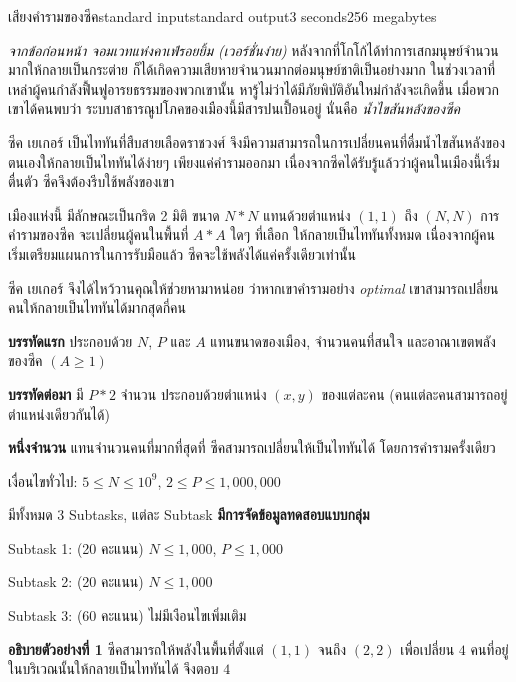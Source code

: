 \documentclass[11pt,a4paper]{article}
\begin{document}
\begin{problem}{เสียงคำรามของซีค}{standard input}{standard output}{3 seconds}{256 megabytes}

\textit{จากข้อก่อนหน้า จอมเวทแห่งคาเฟ่รอยยิ้ม (เวอร์ชั่นง่าย)} หลังจากที่โกโก้ได้ทำการเสกมนุษย์จำนวนมากให้กลายเป็นกระต่าย
ก็ได้เกิดความเสียหายจำนวนมากต่อมนุษย์ชาติเป็นอย่างมาก ในช่วงเวลาที่เหล่าผู้คนกำลังฟื้นฟูอารยธรรมของพวกเขานั้น
หารู้ไม่ว่าได้มีภัยพิบัติอันใหม่กำลังจะเกิดขึ้น เมื่อพวกเขาได้คนพบว่า ระบบสาธารณูปโภคของเมืองนี้มีสารปนเปื้อนอยู่
นั่นคือ \textit{น้ำไขสันหลังของซีค}

ซีค เยเกอร์ เป็นไททันที่สืบสายเลือดราชวงศ์ จึงมีความสามารถในการเปลี่ยนคนที่ดื่มน้ำไขสันหลังของตนเองให้กลายเป็นไททันได้ง่ายๆ
เพียงแค่คำรามออกมา เนื่องจากซีคได้รับรู้แล้วว่าผู้คนในเมืองนี้เริ่มตื่นตัว ซีคจึงต้องรีบใช้พลังของเขา

เมืองแห่งนี้ มีลักษณะเป็นกริด 2 มิติ ขนาด $N*N$ แทนด้วยตำแหน่ง $(1,1)$ ถึง $(N,N)$ 
การคำรามของซีค จะเปลี่ยนผู้คนในพื้นที่ $A*A$ ใดๆ ที่เลือก ให้กลายเป็นไททันทั้งหมด
เนื่องจากผู้คนเริ่มเตรียมแผนการในการรับมือแล้ว ซีคจะใช้พลังได้แค่ครั้งเดียวเท่านั้น

ซีค เยเกอร์ จึงได้ไหว้วานคุณให้ช่วยหามาหน่อย ว่าหากเขาคำรามอย่าง \textit{optimal}
เขาสามารถเปลี่ยนคนให้กลายเป็นไททันได้มากสุดกี่คน

\InputFile

\textbf{บรรทัดแรก} ประกอบด้วย $N$, $P$ และ $A$ แทนขนาดของเมือง, จำนวนคนที่สนใจ และอาณาเขตพลังของซีค $(A \ge 1)$

\textbf{บรรทัดต่อมา} มี $P*2$ จำนวน ประกอบด้วยตำแหน่ง $(x,y)$ ของแต่ละคน
(คนแต่ละคนสามารถอยู่ตำแหน่งเดียวกันได้)

\OutputFile

\textbf{หนึ่งจำนวน} แทนจำนวนคนที่มากที่สุดที่ ซีคสามารถเปลี่ยนให้เป็นไททันได้ โดยการคำรามครั้งเดียว

\Scoring

เงื่อนไขทั่วไป: $5 \le N \le 10^9$, $2 \le P \le 1,000,000$

มีทั้งหมด 3 Subtasks, แต่ละ Subtask \textbf{มีการจัดข้อมูลทดสอบแบบกลุ่ม}

Subtask 1: (20 คะแนน) $N \le 1,000$, $P \le 1,000$

Subtask 2: (20 คะแนน) $N \le 1,000$

Subtask 3: (60 คะแนน) ไม่มีเงือนไขเพิ่มเติม

\Examples

\begin{example}
%
\end{example}

\Note

\textbf{อธิบายตัวอย่างที่ 1} ซีคสามารถให้พลังในพื้นที่ตั้งแต่ $(1,1)$ จนถึง $(2,2)$ เพื่อเปลี่ยน $4$ คนที่อยู่ในบริเวณนั้นให้กลายเป็นไททันได้ จึงตอบ $4$

\end{problem}
\end{document}

